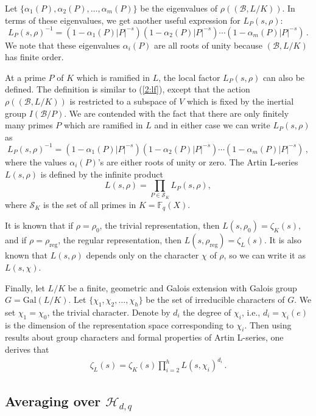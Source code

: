 \documentclass[12pt]{amsart}
\theoremstyle{plain}
\newcommand{\F}{{\mathbb F}_q}
\newcommand{\HH}{{\mathcal H}}
\begin{document}
Let $\{\alpha_1(P), \alpha_2(P), \ldots, \alpha_m(P)\}$ be the eigenvalues of $\rho((\mathcal{B},L/K))$. In terms of these eigenvalues, we get another useful expression for $L_P(s,\rho)$:
\[L_P(s,\rho)^{-1}=\left(1-\alpha_1(P)|P|^{-s}\right)\left(1-\alpha_2(P)|P|^{-s}\right) \cdots \left(1-\alpha_m(P)|P|^{-s}\right)\,.\]
We note that these eigenvalues $\alpha_i(P)$ are all roots of unity because $(\mathcal{B},L/K)$ has finite order.

At a prime $P$ of $K$ which is ramified in $L$, the local factor $L_P(s,\rho)$ can also be defined. The definition is similar to (\ref{2:lf}), except that the action $\rho((\mathcal{B},L/K))$ is restricted to a subspace of $V$ which is fixed by the inertial group $I(\mathcal{B}/P)$. We are contended with the fact that there are only finitely many primes $P$ which are ramified in $L$ and in either case we can write $L_P(s,\rho)$ as
\[L_P(s,\rho)^{-1}=\left(1-\alpha_1(P)|P|^{-s}\right)\left(1-\alpha_2(P)|P|^{-s}\right) \cdots \left(1-\alpha_m(P)|P|^{-s}\right)\,,\]
where the values $\alpha_i(P)$'s are either roots of unity or zero. The Artin L-series $L(s,\rho)$ is defined by the infinite product
\[L(s,\rho)=\prod_{P \in \mathcal{S}_K} L_P(s,\rho), \]
where $\mathcal{S}_K$ is the set of all primes in $K=\F(X)$.

It is known that if $\rho=\rho_0$, the trivial representation, then $L(s,\rho_0)=\zeta_K(s)$, and if $\rho=\rho_{\mathrm{reg}}$, the regular representation, then $L(s,\rho_{\mathrm{reg}})=\zeta_L(s)$. It is also known that $L(s,\rho)$ depends only on the character $\chi$ of $\rho$, so we can write it as $L(s,\chi)$. 

Finally, let $L/K$ be a finite, geometric and Galois extension with Galois group $G=\mathrm{Gal}(L/K)$. Let $\{\chi_1,\chi_2,\ldots,\chi_h\}$ be the set of irreducible characters of $G$. We set $\chi_1=\chi_0$, the trivial character. Denote by $d_i$ the degree of $\chi_i$, i.e., $d_i=\chi_i(e)$ is the dimension of the representation space corresponding to $\chi_i$. Then using results about group characters and formal properties of Artin L-series, one derives that
\begin{eqnarray} \label{2:lfunction}
\zeta_L(s)=\zeta_K(s) \prod_{i=2}^h L(s,\chi_i)^{d_i}\,.
\end{eqnarray}

\subsection{Averaging over $\HH_{d,q}$} %
\end{document}
